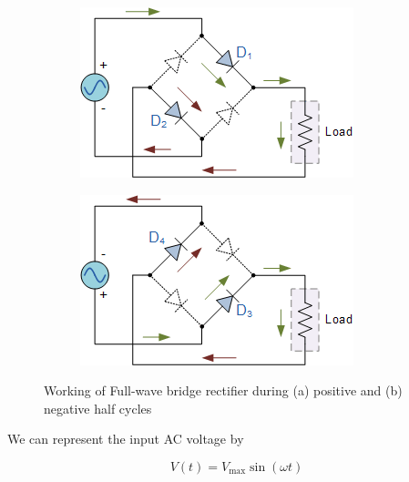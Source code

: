 \begin{figure}[H]
     \centering
     \begin{subfigure}[b]{0.25\textwidth}
         \centering
         \includegraphics[width=\textwidth]{images/f2.png}
         \caption{}
     \end{subfigure}
     \hfill
     \begin{subfigure}[b]{0.25\textwidth}
         \centering
         \includegraphics[width=\textwidth]{images/f3.png}
         \caption{}
     \end{subfigure}
     \hfill
        \caption{Working of Full-wave bridge rectifier during (a) positive and (b) negative half cycles}
\end{figure}

We can represent the input AC voltage by 

\begin{equation*}
    V(t) = V_\text{max}\sin(\omega t)   
\end{equation*}

